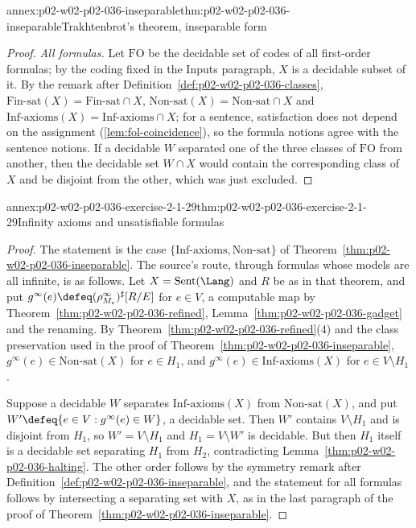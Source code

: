 \begin{annexitem}{annex:p02-w02-p02-036-inseparable}{thm:p02-w02-p02-036-inseparable}{Trakhtenbrot's theorem, inseparable form}
\begin{proof}
\emph{All formulas.}  Let \(\mathrm{FO}\) be the decidable set of codes of all
first-order formulas; by the coding fixed in the Inputs paragraph, \(X\) is a
decidable subset of it.  By the remark after
Definition~\ref{def:p02-w02-p02-036-classes},
\(\mathrm{Fin\text{-}sat}(X)=\mathrm{Fin\text{-}sat}\cap X\),
\(\mathrm{Non\text{-}sat}(X)=\mathrm{Non\text{-}sat}\cap X\) and
\(\mathrm{Inf\text{-}axioms}(X)=\mathrm{Inf\text{-}axioms}\cap X\); for a
sentence, satisfaction does not depend on the assignment
(\cref{lem:fol-coincidence}), so the formula notions agree with the sentence
notions.  If a decidable \(W\) separated one of the three classes of
\(\mathrm{FO}\) from another, then the decidable set \(W\cap X\) would contain
the corresponding class of \(X\) and be disjoint from the other, which was
just excluded.
\end{proof}
\end{annexitem}

\begin{annexitem}{annex:p02-w02-p02-036-exercise-2-1-29}{thm:p02-w02-p02-036-exercise-2-1-29}{Infinity axioms and unsatisfiable formulas}
\begin{proof}
The statement is the case \(\{\mathrm{Inf\text{-}axioms},
\mathrm{Non\text{-}sat}\}\) of Theorem~\ref{thm:p02-w02-p02-036-inseparable}.
The source's route, through formulas whose models are all infinite, is as
follows.  Let \(X=\operatorname{Sent}(\Lang)\) and \(R\) be as in that theorem,
and put \(g^{\infty}(e)\defeq(\rho^{\infty}_{M_e})^{\sharp}[R/E]\) for
\(e\in V\), a computable map by
Theorem~\ref{thm:p02-w02-p02-036-refined}, Lemma~\ref{thm:p02-w02-p02-036-gadget}
and the renaming.  By Theorem~\ref{thm:p02-w02-p02-036-refined}(4) and the
class preservation used in the proof of
Theorem~\ref{thm:p02-w02-p02-036-inseparable}, \(g^{\infty}(e)\in
\mathrm{Non\text{-}sat}(X)\) for \(e\in H_1\), and \(g^{\infty}(e)\in
\mathrm{Inf\text{-}axioms}(X)\) for \(e\in V\setminus H_1\).

Suppose a decidable \(W\) separates \(\mathrm{Inf\text{-}axioms}(X)\) from
\(\mathrm{Non\text{-}sat}(X)\), and put \(W'\defeq\{e\in V:g^{\infty}(e)\in
W\}\), a decidable set.  Then \(W'\) contains \(V\setminus H_1\) and is
disjoint from \(H_1\), so \(W'=V\setminus H_1\) and \(H_1=V\setminus W'\) is
decidable.  But then \(H_1\) itself is a decidable set separating \(H_1\) from
\(H_2\), contradicting Lemma~\ref{thm:p02-w02-p02-036-halting}.  The other
order follows by the symmetry remark after
Definition~\ref{def:p02-w02-p02-036-inseparable}, and the statement for all
formulas follows by intersecting a separating set with \(X\), as in the last
paragraph of the proof of Theorem~\ref{thm:p02-w02-p02-036-inseparable}.
\end{proof}
\end{annexitem}

